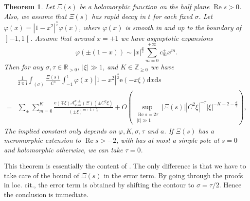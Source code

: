 \documentclass[10pt,oneside,reqno]{amsart}
\makeatletter
\newcommand\lopen{\mathopen{]}}
\newcommand\ropen{\mathclose{[}}
\newcommand\rmd{\mathrm{d}}
\newcommand\rme{\mathrm{e}}
\newcommand\rmi{\mathrm{i}}
\newcommand\cA{\mathcal{A}}
\newcommand\RR{\mathbb{R}}
\newcommand\ZZ{\mathbb{Z}}
\newcommand\dpii{2\uppi\rmi}
\renewcommand\Re{\mathop{\mathrm{Re}}}
\renewcommand\geq{\geqslant}
\theoremstyle{THEOREM}
\newtheorem{theorem}{Theorem}[section]
\theoremstyle{DEFINITION}
\theoremstyle{EXERCISE}
\numberwithin{equation}{section}
\renewenvironment{proof}[1][\proofname]{\par
  \vspace{-6pt}
  \pushQED{\qed}
  \normalfont \topsep6\p@\@plus6\p@\relax
  \trivlist
  \item[\hskip\labelsep\rmfamily\bfseries
    #1\@addpunct{:}]\ignorespaces
}{
  \popQED\endtrivlist\@endpefalse
  \vspace{-6pt}
}
\makeatother
\begin{document}
\begin{theorem}\label{thm:mainarchimedeantheorem1}
Let $\Xi(s)$ be a holomorphic function on the half plane $\Re s>0$. Also, we assume that $\Xi(s)$ has rapid decay in $t$ for each fixed $\sigma$. Let $\varphi(x)=|1-x^2|^{\frac a2}\overline{\varphi}(x)$, where $\overline{\varphi}(x)$ is smooth in and up to the boundary of $\lopen -1,1\ropen$. Assume that around $x=\pm 1$ we have asymptotic expansions
\[
\varphi(\pm(1-x))\sim |x|^{\frac{a}{2}}\sum_{m=0}^{+\infty}c_m^\pm x^m.
\]
Then for any $\sigma,\tau\in \RR_{>0}$, $|\xi|\gg 1$, and $K\in \ZZ_{\geq 0}$ we have
\begin{align*}
    & \frac{1}{\dpii}\int_{(\sigma)}\frac{\Xi(s)}{C^s}\int_{-1}^{1}\varphi(x)|1-x^2|^{\frac s2} \rme(-x\xi)\rmd x\rmd s \\
   =  & \sum_{\pm}\sum_{m=0}^{K}\frac{\rme(\mp \xi)\cA_{\varphi,m}^{\sigma,\pm}(\Xi)(\pm C^2\xi)}{(\pm\xi)^{m+1+\frac a2}}+ O\left(\sup_{\substack{\Re s=2\tau \\ |t|\gg 1}}|\Xi(s)||C^2\xi|^{-\tau}|\xi|^{-K-2-\frac{a}{2}}\right),
\end{align*}
The implied constant only depends on $\varphi,K,\sigma,\tau$ and $a$. 
If $\Xi(s)$ has a meromorphic extension to $\Re s>-2$, with has at most a simple pole at $s=0$ and holomorphic otherwise, we can take $\tau=0$.
\end{theorem} 
\begin{proof}
This theorem is essentially the content of \cite[Theorem A.14]{altug2017}. The only difference is that we have to take care of the bound of $\Xi(s)$ in the error term. By going through the proofs in loc. cit., the error term is obtained by shifting the contour to $\sigma=\tau/2$. Hence the conclusion is immediate.
\end{proof}
\end{document}
